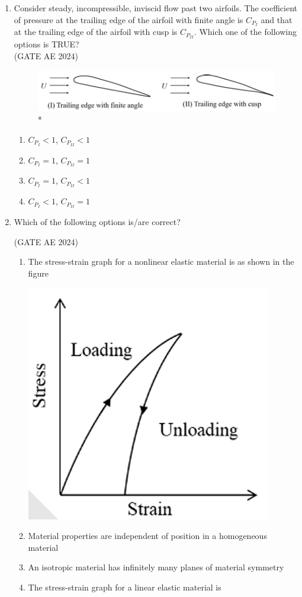 \documentclass[journal,12pt,onecolumn]{IEEEtran}
\theoremstyle{remark}
\begin{document}
\begin{flushleft}
\begin{enumerate}
\item Consider steady, incompressible, inviscid flow past two airfoils. The coefficient of pressure at the trailing edge of the airfoil with finite angle is $C_{P_I}$ and that at the trailing edge of the airfoil with cusp is $C_{P_{II}}$. Which one of the following options is TRUE?\\ \hfill (GATE AE 2024)\\
\begin{figure}[H]
\includegraphics[width=0.5\columnwidth]{figs/angle.png}
\caption{*}
    \label{fig:placeholder}
\end{figure}

\begin{enumerate}
    \item $C_{P_I} < 1$, $C_{P_{II}} < 1$
    \item $C_{P_I} = 1$, $C_{P_{II}} = 1$
    \item $C_{P_I} = 1$, $C_{P_{II}} < 1$
    \item $C_{P_I} < 1$, $C_{P_{II}} = 1$
\end{enumerate}

\item  Which of the following options is/are correct?

\hfill (GATE AE 2024)

\begin{enumerate}
    \item The stress-strain graph for a nonlinear elastic material is as shown in the figure 
    
    \hfill{\includegraphics[width=0.25\columnwidth]{figs/1.png}}
    
    \item Material properties are independent of position in a homogeneous material
    \item An isotropic material has infinitely many planes of material symmetry
    \item The stress-strain graph for a linear elastic material is
    

\end{enumerate}
\end{enumerate}
\end{flushleft}
\end{document}
